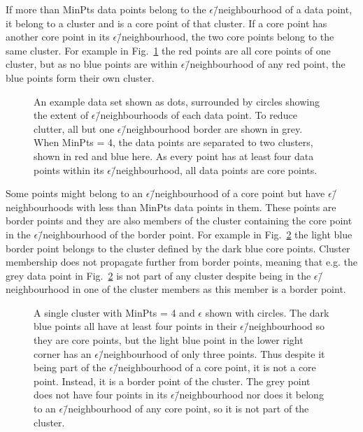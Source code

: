 \documentclass[english, oneside]{HYgradu}
\begin{document}
If more than MinPts data points belong to the $\epsilon$\=/neighbourhood of a data point, it belong to a cluster and is a core point of that cluster. If a core point has another core point in its $\epsilon$\=/neighbourhood, the two core points belong to the same cluster. For example in Fig.\ \ref{fig:DBSCAN-twocores} the red points are all core points of one cluster, but as no blue points are within $\epsilon$\=/neighbourhood of any red point, the blue points form their own cluster.

\begin{figure}
    \centering
    
    \caption{An example data set shown as dots, surrounded by circles showing the extent of $\epsilon$\=/neighbourhoods of each data point. To reduce clutter, all but one $\epsilon$\=/neighbourhood border are shown in grey. When MinPts = 4, the data points are separated to two clusters, shown in red and blue here. As every point has at least four data points within its $\epsilon$\=/neighbourhood, all data points are core points.}\label{fig:DBSCAN-twocores}
\end{figure}

Some points might belong to an $\epsilon$\=/neighbourhood of a core point but have $\epsilon$\=/neighbourhoods with less than MinPts data points in them. These points are border points and they are also members of the cluster containing the core point in the $\epsilon$\=/neighbourhood of the border point. For example in Fig.\ \ref{fig:DBSCAN-borderpoint} the light blue border point belongs to the cluster defined by the dark blue core points. Cluster membership does not propagate further from border points, meaning that e.g. the grey data point in Fig.\ \ref{fig:DBSCAN-borderpoint} is not part of any cluster despite being in the $\epsilon$\=/neighbourhood in one of the cluster members as this member is a border point.

\begin{figure}
    \centering
    
    \caption{A single cluster with MinPts = 4 and $\epsilon$ shown with circles. The dark blue points all have at least four points in their $\epsilon$\=/neighbourhood so they are core points, but the light blue point in the lower right corner has an $\epsilon$\=/neighbourhood of only three points. Thus despite it being part of the $\epsilon$\=/neighbourhood of a core point, it is not a core point. Instead, it is a border point of the cluster. The grey point does not have four points in its $\epsilon$\=/neighbourhood nor does it belong to an $\epsilon$\=/neighbourhood of any core point, so it is not part of the cluster.}\label{fig:DBSCAN-borderpoint}
\end{figure}
\end{document}
